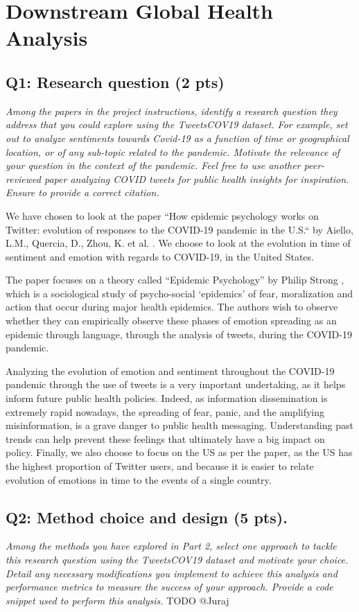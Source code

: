 \section{Downstream Global Health Analysis}

\subsection*{Q1: Research question (2 pts)}
\textit{Among the papers in the project instructions, identify a research question they address that you could explore using the TweetsCOV19 dataset. For example, set out to analyze sentiments towards Covid-19 as a function of time or geographical location, or of any sub-topic related to the pandemic. Motivate the relevance of your question in the context of the pandemic. Feel free to use another peer-reviewed paper analyzing COVID tweets for public health insights for inspiration. Ensure to provide a correct citation.}

We have chosen to look at the paper “How epidemic psychology works on Twitter: evolution of responses to the COVID-19 pandemic in the U.S.“ by Aiello, L.M., Quercia, D., Zhou, K. et al. \cite{aiello2021epidemic}. We choose to look at the evolution in time of sentiment and emotion with regards to COVID-19, in the United States. 

The paper focuses on a theory called “Epidemic Psychology” by Philip Strong \cite{strong1990epidemic}, which is a sociological study of psycho-social ‘epidemics’ of fear, moralization and action that occur during major health epidemics. The authors wish to observe whether they can empirically observe these phases of emotion spreading as an epidemic through language, through the analysis of tweets, during the COVID-19 pandemic. 

Analyzing the evolution of emotion and sentiment throughout the COVID-19 pandemic through the use of tweets is a very important undertaking, as it helps inform future public health policies. Indeed, as information dissemination is extremely rapid nowadays, the spreading of fear, panic, and the amplifying misinformation, is a grave danger to public health messaging. Understanding past trends can help prevent these feelings that ultimately have a big impact on policy. Finally, we also choose to focus on the US as per the paper, as the US has the highest proportion of Twitter users, and because it is easier to relate evolution of emotions in time to the events of a single country.


\subsection*{Q2: Method choice and design (5 pts).}
\textit{Among the methods you have explored in Part 2, select one approach to tackle this research question using the TweetsCOV19 dataset and motivate your choice. Detail any necessary modifications you implement to achieve this analysis and performance metrics to measure the success of your approach. Provide a code snippet used to perform this analysis.}
TODO @Juraj

